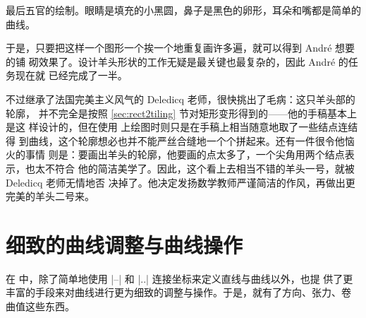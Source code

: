 最后五官的绘制。眼睛是填充的小黑圆，鼻子是黑色的卵形，耳朵和嘴都是简单的曲线。

于是，只要把这样一个图形一个挨一个地重复画许多遍，就可以得到 André 想要的铺
砌效果了。设计羊头形状的工作无疑是最关键也最复杂的，因此 André 的任务现在就
已经完成了一半。

不过继承了法国完美主义风气的 Deledicq 老师，很快挑出了毛病：这只羊头部的轮廓，
并不完全是按照 \ref{sec:rect2tiling} 节对矩形变形得到的——他的手稿基本上是这
样设计的，但在使用 \Asy{} 上绘图时则只是在手稿上相当随意地取了一些结点连结得
到曲线，这个轮廓想必也并不能严丝合缝地一个个拼起来。还有一件很令他恼火的事情
则是：要画出羊头的轮廓，他要画的点太多了，一个尖角用两个结点表示，也太不符合
他的简洁美学了。因此，这个看上去相当不错的羊头一号，就被 Deledicq 老师无情地否
决掉了。他决定发扬数学教师严谨简洁的作风，再做出更完美的羊头二号来。

\section{细致的曲线调整与曲线操作}
\label{sec:curve}

在 \Asy{} 中，除了简单地使用 |--| 和 |..| 连接坐标来定义直线与曲线以外，也提
供了更丰富的手段来对曲线进行更为细致的调整与操作。于是，就有了方向、张力、卷
曲值这些东西。

